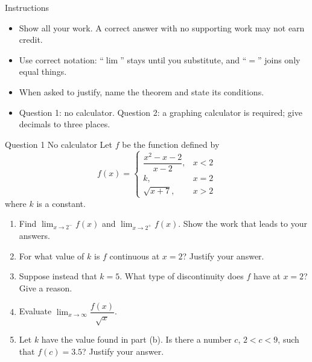 \documentclass[11pt]{article}
\begin{document}

\begin{scorebox}{Instructions}
\begin{itemize}[leftmargin=*,itemsep=2pt,topsep=2pt]
  \item Show all your work. A correct answer with no supporting work may not earn credit.
  \item Use correct notation: \textquotedblleft{}$\lim$\textquotedblright{} stays until you substitute, and \textquotedblleft{}$=$\textquotedblright{} joins only equal things.
  \item When asked to justify, name the theorem and state its conditions.
  \item Question 1: no calculator. Question 2: a graphing calculator is required; give decimals to three places.
\end{itemize}
\end{scorebox}

\begin{frbox}{Question 1 \textperiodcentered{} No calculator}
Let $f$ be the function defined by
\[ f(x)=\begin{cases}\dfrac{x^2-x-2}{x-2},&x<2\\[2mm]k,&x=2\\[1mm]\sqrt{x+7},&x>2\end{cases}\]
where $k$ is a constant.
\begin{enumerate}[label=(\alph*),leftmargin=*,itemsep=2pt]
  \item Find $\displaystyle\lim_{x\to 2^-}f(x)$ and $\displaystyle\lim_{x\to 2^+}f(x)$. Show the work that leads to your answers.\work{3.4cm}
  \item For what value of $k$ is $f$ continuous at $x=2$? Justify your answer.\work{2.6cm}
  \item Suppose instead that $k=5$. What type of discontinuity does $f$ have at $x=2$? Give a reason.\work{2.2cm}
  \item Evaluate $\displaystyle\lim_{x\to \infty}\dfrac{f(x)}{\sqrt{x}}$.\work{2.6cm}
  \item Let $k$ have the value found in part (b). Is there a number $c$, $2<c<9$, such that $f(c)=3.5$? Justify your answer.\work{2.8cm}
\end{enumerate}
\end{frbox}
\end{document}
